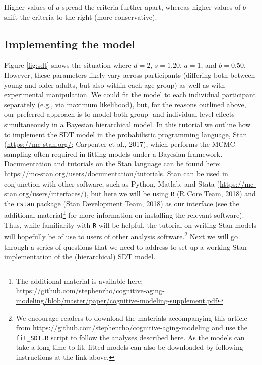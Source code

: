 \documentclass[
  english,
  ,man,floatsintext]{apa6}
\begin{document}
Higher values of \(a\) spread the criteria further apart, whereas higher values of \(b\) shift the criteria to the right (more conservative).

\hypertarget{implementing-the-model}{%
\subsection{Implementing the model}\label{implementing-the-model}}

Figure \ref{fig:sdt} shows the situation where \(d = 2\), \(s = 1.20\), \(a = 1\), and \(b = 0.50\). However, these parameters likely vary across participants (differing both between young and older adults, but also within each age group) as well as with experimental manipulation. We could fit the model to each individual participant separately (e.g., via maximum likelihood), but, for the reasons outlined above, our preferred approach is to model both group- and individual-level effects simultaneously in a Bayesian hierarchical model. In this tutorial we outline how to implement the SDT model in the probabilistic programming language, Stan (\url{https://mc-stan.org/}; Carpenter et al., 2017), which performs the MCMC sampling often required in fitting models under a Bayesian framework. Documentation and tutorials on the Stan language can be found here: \url{https://mc-stan.org/users/documentation/tutorials}. Stan can be used in conjunction with other software, such as Python, Matlab, and Stata (\url{https://mc-stan.org/users/interfaces/}), but here we will be using \texttt{R} (R Core Team, 2018) and the \texttt{rstan} package (Stan Development Team, 2018) as our interface (see the additional material\footnote{The additional material is available here: \url{https://github.com/stephenrho/cognitive-aging-modeling/blob/master/paper/cognitive-modeling-supplement.pdf}} for more information on installing the relevant software). Thus, while familiarity with \texttt{R} will be helpful, the tutorial on writing Stan models will hopefully be of use to users of other analysis software.\footnote{We encourage readers to download the materials accompanying this article from \url{https://github.com/stephenrho/cognitive-aging-modeling} and use the \texttt{fit\_SDT.R} script to follow the analyses described here. As the models can take a long time to fit, fitted models can also be downloaded by following instructions at the link above.} Next we will go through a series of questions that we need to address to set up a working Stan implementation of the (hierarchical) SDT model.
\end{document}
